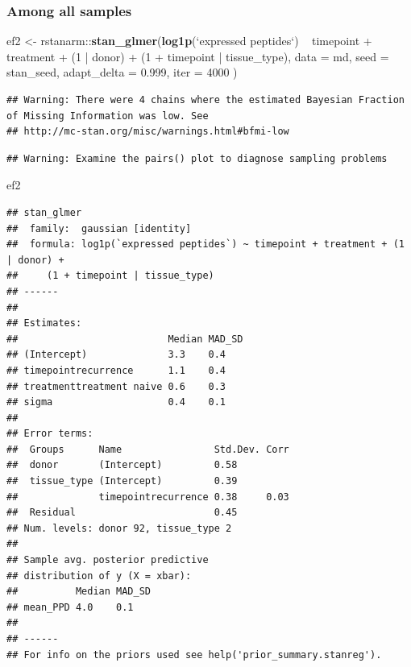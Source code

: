 \documentclass[]{article}
\newenvironment{Shaded}{\begin{snugshade}}{\end{snugshade}}
\newcommand{\KeywordTok}[1]{\textcolor[rgb]{0.13,0.29,0.53}{\textbf{{#1}}}}
\newcommand{\DataTypeTok}[1]{\textcolor[rgb]{0.13,0.29,0.53}{{#1}}}
\newcommand{\DecValTok}[1]{\textcolor[rgb]{0.00,0.00,0.81}{{#1}}}
\newcommand{\FloatTok}[1]{\textcolor[rgb]{0.00,0.00,0.81}{{#1}}}
\newcommand{\StringTok}[1]{\textcolor[rgb]{0.31,0.60,0.02}{{#1}}}
\newcommand{\NormalTok}[1]{{#1}}
\begin{document}
\subsubsection{Among all samples}\label{among-all-samples-1}

\begin{Shaded}
\begin{Highlighting}[]
\NormalTok{ef2 <-}\StringTok{ }\NormalTok{rstanarm::}\KeywordTok{stan_glmer}\NormalTok{(}\KeywordTok{log1p}\NormalTok{(}\StringTok{`}\DataTypeTok{expressed peptides}\StringTok{`}\NormalTok{) ~}
\StringTok{                                }\NormalTok{timepoint +}\StringTok{ }\NormalTok{treatment +}\StringTok{ }\NormalTok{(}\DecValTok{1} \NormalTok{|}\StringTok{ }\NormalTok{donor) +}
\StringTok{                                }\NormalTok{(}\DecValTok{1} \NormalTok{+}\StringTok{ }\NormalTok{timepoint |}\StringTok{ }\NormalTok{tissue_type),}
                              \DataTypeTok{data =} \NormalTok{md,}
                              \DataTypeTok{seed =} \NormalTok{stan_seed,}
                              \DataTypeTok{adapt_delta =} \FloatTok{0.999}\NormalTok{,}
                              \DataTypeTok{iter =} \DecValTok{4000}
                              \NormalTok{)}
\end{Highlighting}
\end{Shaded}

\begin{verbatim}
## Warning: There were 4 chains where the estimated Bayesian Fraction of Missing Information was low. See
## http://mc-stan.org/misc/warnings.html#bfmi-low
\end{verbatim}

\begin{verbatim}
## Warning: Examine the pairs() plot to diagnose sampling problems
\end{verbatim}

\begin{Shaded}
\begin{Highlighting}[]
\NormalTok{ef2}
\end{Highlighting}
\end{Shaded}

\begin{verbatim}
## stan_glmer
##  family:  gaussian [identity]
##  formula: log1p(`expressed peptides`) ~ timepoint + treatment + (1 | donor) + 
##     (1 + timepoint | tissue_type)
## ------
## 
## Estimates:
##                          Median MAD_SD
## (Intercept)              3.3    0.4   
## timepointrecurrence      1.1    0.4   
## treatmenttreatment naive 0.6    0.3   
## sigma                    0.4    0.1   
## 
## Error terms:
##  Groups      Name                Std.Dev. Corr
##  donor       (Intercept)         0.58         
##  tissue_type (Intercept)         0.39         
##              timepointrecurrence 0.38     0.03
##  Residual                        0.45         
## Num. levels: donor 92, tissue_type 2 
## 
## Sample avg. posterior predictive 
## distribution of y (X = xbar):
##          Median MAD_SD
## mean_PPD 4.0    0.1   
## 
## ------
## For info on the priors used see help('prior_summary.stanreg').
\end{verbatim}
\end{document}

